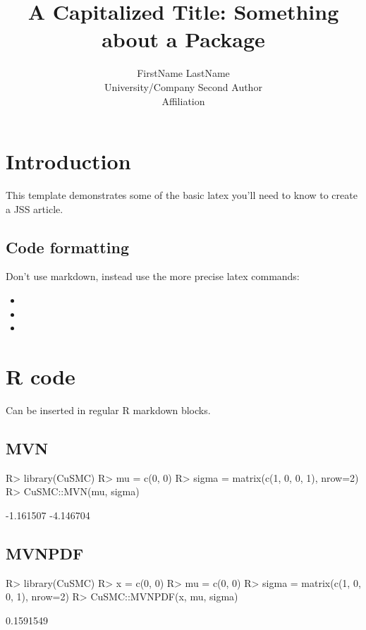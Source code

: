 \documentclass[
]{jss}
\author{
FirstName LastName\\University/Company \And Second Author\\Affiliation
}
\title{A Capitalized Title: Something about a Package \pkg{foo}}
\begin{document}
\hypertarget{introduction}{%
\section{Introduction}\label{introduction}}

This template demonstrates some of the basic latex you'll need to know
to create a JSS article.

\hypertarget{code-formatting}{%
\subsection{Code formatting}\label{code-formatting}}

Don't use markdown, instead use the more precise latex commands:

\begin{itemize}
\item
\item
\item
\end{itemize}

\hypertarget{r-code}{%
\section{R code}\label{r-code}}

Can be inserted in regular R markdown blocks.

\hypertarget{mvn}{%
\subsection{MVN}\label{mvn}}

\begin{CodeChunk}

\begin{CodeInput}
R> library(CuSMC)
R> mu = c(0, 0)
R> sigma = matrix(c(1, 0, 0, 1), nrow=2)
R> CuSMC::MVN(mu, sigma)
\end{CodeInput}

\begin{CodeOutput}
[1] -1.161507 -4.146704
\end{CodeOutput}
\end{CodeChunk}

\hypertarget{mvnpdf}{%
\subsection{MVNPDF}\label{mvnpdf}}

\begin{CodeChunk}

\begin{CodeInput}
R> library(CuSMC)
R> x = c(0, 0)
R> mu = c(0, 0)
R> sigma = matrix(c(1, 0, 0, 1), nrow=2)
R> CuSMC::MVNPDF(x, mu, sigma)
\end{CodeInput}

\begin{CodeOutput}
[1] 0.1591549
\end{CodeOutput}
\end{CodeChunk}
\end{document}
